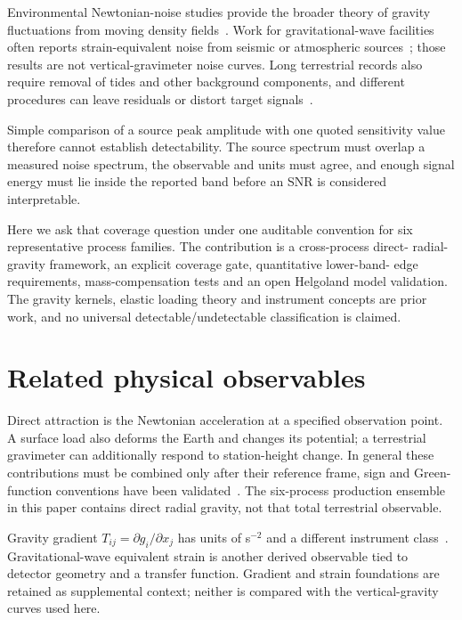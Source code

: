\documentclass[11pt]{article}
\begin{document}
Environmental Newtonian-noise studies provide the broader theory of gravity
fluctuations from moving density fields~\cite{Harms2015,VanCamp2017}. Work for
gravitational-wave facilities often reports strain-equivalent noise from
seismic or atmospheric sources~\cite{Creighton2008,Brundu2022,Hall2022}; those
results are not vertical-gravimeter noise curves. Long terrestrial records also
require removal of tides and other background components, and different
procedures can leave residuals or distort target signals~\cite{Valencio2017}.

Simple comparison of a source peak amplitude with one quoted sensitivity value
therefore cannot establish detectability. The source spectrum must overlap a
measured noise spectrum, the observable and units must agree, and enough signal
energy must lie inside the reported band before an SNR is considered interpretable.

Here we ask that coverage question under one auditable convention for six
representative process families. The contribution is a cross-process direct-
radial-gravity framework, an explicit coverage gate, quantitative lower-band-
edge requirements, mass-compensation tests and an open Helgoland model
validation. The gravity kernels, elastic loading theory and instrument concepts
are prior work, and no universal detectable/undetectable classification is
claimed.

\section{Related physical observables}
Direct attraction is the Newtonian acceleration at a specified observation
point. A surface load also deforms the Earth and changes its potential; a
terrestrial gravimeter can additionally respond to station-height change. In
general these contributions must be combined only after their reference frame,
sign and Green-function conventions have been validated~\cite{Farrell1972,
DziewonskiAnderson1981,Martens2019}. The six-process production ensemble in this
paper contains direct radial gravity, not that total terrestrial observable.

Gravity gradient $T_{ij}=\partial g_i/\partial x_j$ has units of s$^{-2}$ and a
different instrument class~\cite{McGuirk2002,Sorrentino2014}. Gravitational-wave
equivalent strain is another derived observable tied to detector geometry and a
transfer function. Gradient and strain foundations are retained as supplemental
context; neither is compared with the vertical-gravity curves used here.
\end{document}
